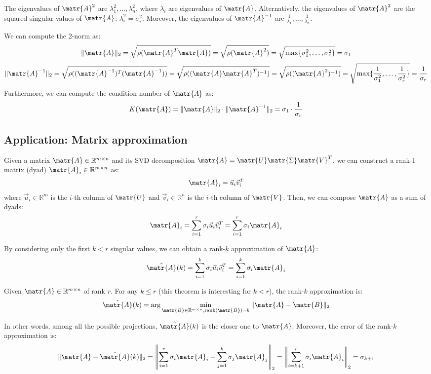 The eigenvalues of $\matr{A}^2$ are $\lambda_1^2, \dots,\lambda_n^2$, where $\lambda_i$ are eigenvalues of $\matr{A}$.
Alternatively, the eigenvalues of $\matr{A}^2$ are the squared singular values of $\matr{A}$: $\lambda_i^2 = \sigma_i^2$.
Moreover, the eigenvalues of $\matr{A}^{-1}$ are $\frac{1}{\lambda_1}, \dots, \frac{1}{\lambda_n}$.

We can compute the 2-norm as:
\[ \Vert \matr{A} \Vert_2 = \sqrt{\rho(\matr{A}^T\matr{A})} = \sqrt{\rho(\matr{A}^2)} = \sqrt{\max\{\sigma_1^2, \dots, \sigma_r^2\}} = \sigma_1 \]
\[ 
    \Vert \matr{A}^{-1} \Vert_2 = \sqrt{\rho((\matr{A}^{-1})^T(\matr{A}^{-1}))} = 
    \sqrt{\rho((\matr{A}\matr{A}^T)^{-1})} = \sqrt{\rho((\matr{A}^2)^{-1})} = \sqrt{\max\{\frac{1}{\sigma_1^2}, \dots, \frac{1}{\sigma_r^2}\}} = \frac{1}{\sigma_r}
\]
Furthermore, we can compute the condition number of $\matr{A}$ as:
\[ K(\matr{A}) = \Vert \matr{A} \Vert_2 \cdot \Vert \matr{A}^{-1} \Vert_2 = \sigma_1 \cdot \frac{1}{\sigma_r} \]



\subsection{Application: Matrix approximation}
Given a matrix $\matr{A} \in \mathbb{R}^{m \times n}$ and its SVD decomposition $\matr{A} = \matr{U}\matr{\Sigma}\matr{V}^T$,
we can construct a rank-1 matrix (dyad) $\matr{A}_i \in \mathbb{R}^{m \times n}$ as: 
\[ \matr{A}_i = \vec{u}_i \vec{v}_i^T \]
where $\vec{u}_i \in \mathbb{R}^m$ is the $i$-th column of $\matr{U}$ and
$\vec{v}_i \in \mathbb{R}^n$ is the $i$-th column of $\matr{V}$.
Then, we can compose $\matr{A}$ as a sum of dyads:
\[ \matr{A}_i = \sum_{i=1}^{r} \sigma_i \vec{u}_i \vec{v}_i^T = \sum_{i=1}^{r} \sigma_i \matr{A}_i \]

By considering only the first $k < r$ singular values, we can obtain a rank-$k$ approximation of $\matr{A}$:
\[ \hat{\matr{A}}(k) = \sum_{i=1}^{k} \sigma_i \vec{u}_i \vec{v}_i^T = \sum_{i=1}^{k} \sigma_i \matr{A}_i \]

\begin{theorem}
    Given $\matr{A} \in \mathbb{R}^{m \times n}$ of rank $r$.
    For any $k \leq r$ (this theorem is interesting for $k < r$), the rank-$k$ approximation is:
    \[ 
        \hat{\matr{A}}(k) = \arg \min_{\matr{B} \in \mathbb{R}^{m \times n}, \text{rank}(\matr{B}) = k} \Vert \matr{A} - \matr{B} \Vert_2 
    \]
\end{theorem}
In other words, among all the possible projections, $\hat{\matr{A}}(k)$ is the closer one to $\matr{A}$.
Moreover, the error of the rank-$k$ approximation is:
\[
    \Vert \matr{A} - \hat{\matr{A}}(k) \Vert_2 = 
        \left\Vert \sum_{i=1}^{r} \sigma_i \matr{A}_i - \sum_{j=1}^{k} \sigma_j \matr{A}_j \right\Vert_2 =
        \left\Vert \sum_{i=k+1}^{r} \sigma_i \matr{A}_i \right\Vert_2 = 
        \sigma_{k+1}
\]

